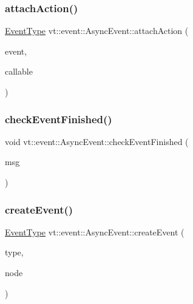 \subsubsection{\texorpdfstring{attach\+Action()}{attachAction()}}
{\footnotesize\ttfamily \hyperlink{namespacevt_a009267401def7ae8bf201892222d060f}{Event\+Type} vt\+::event\+::\+Async\+Event\+::attach\+Action (\begin{DoxyParamCaption}\item[{\hyperlink{namespacevt_a009267401def7ae8bf201892222d060f}{Event\+Type} const \&}]{event,  }\item[{\hyperlink{namespacevt_ae0a5a7b18cc99d7b732cb4d44f46b0f3}{Action\+Type}}]{callable }\end{DoxyParamCaption})}

\mbox{\label{structvt_1_1event_1_1_async_event_a5493f4402db0fffba5300246247523b9}} 
\subsubsection{\texorpdfstring{check\+Event\+Finished()}{checkEventFinished()}}
{\footnotesize\ttfamily void vt\+::event\+::\+Async\+Event\+::check\+Event\+Finished (\begin{DoxyParamCaption}\item[{\hyperlink{structvt_1_1_event_check_finished_msg}{Event\+Check\+Finished\+Msg} $\ast$}]{msg }\end{DoxyParamCaption})\hspace{0.3cm}{\ttfamily [static]}}

\mbox{\label{structvt_1_1event_1_1_async_event_abc1629d13f9f3391e5e7f9ebc6303265}} 
\subsubsection{\texorpdfstring{create\+Event()}{createEvent()}}
{\footnotesize\ttfamily \hyperlink{namespacevt_a009267401def7ae8bf201892222d060f}{Event\+Type} vt\+::event\+::\+Async\+Event\+::create\+Event (\begin{DoxyParamCaption}\item[{\hyperlink{namespacevt_1_1event_a1ea9fec44d101bf40b8fd786d44ebed9}{Event\+Record\+Type\+Type} const \&}]{type,  }\item[{\hyperlink{namespacevt_a866da9d0efc19c0a1ce79e9e492f47e2}{Node\+Type} const \&}]{node }\end{DoxyParamCaption})}

